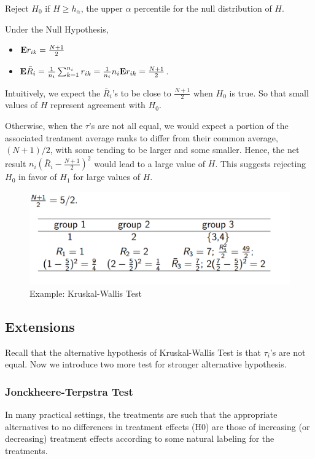 Reject $H_0$ if $H \ge h_\alpha$, the upper $\alpha$ percentile for the null distribution of $H$.

Under the Null Hypothesis, 
\begin{itemize}
	\item ${\mathbf E} r_{ik} = \frac{N+1}{2}$
	\item ${\mathbf E} \bar{R}_i = \frac{1}{n_i} \sum_{k=1}^{n_i} r_{ik} = \frac{1}{n_i} n_i {\mathbf E} r_{ik} = \frac{N + 1}{2}$.
\end{itemize}


Intuitively, we expect the $\bar{R}_i$'s to be close to $\frac{N+1}{2}$ when $H_0$ is true. So that small values of $H$ represent agreement with $H_0$. 

Otherwise, when the $\tau$'s are not all equal, we would expect a portion of the associated treatment average ranks to differ from their common average, $(N+1)/2$, with some tending to be larger and some smaller. Hence, the net result $n_i(\bar{R}_i - \frac{N+1}{2})^2$ would lead to a large value of $H$. This suggests rejecting $H_0$ in favor of $H_1$ for large values of $H$.

\begin{figure}[H]
	\centering
	\includegraphics[width=0.7\linewidth]{fig/kruskal-wallis}
	\caption{Example: Kruskal-Wallis Test}
	\label{fig:kruskal-wallis}
\end{figure}

\subsection{Extensions}
Recall that the alternative hypothesis of Kruskal-Wallis Test is that $\tau_i$'s are not equal. Now we introduce two more test for stronger alternative hypothesis.

\subsubsection{Jonckheere-Terpstra Test}
In many practical settings, the treatments are such that the
appropriate alternatives to no differences in treatment effects
(H0) are those of increasing (or decreasing) treatment effects
according to some natural labeling for the treatments.

